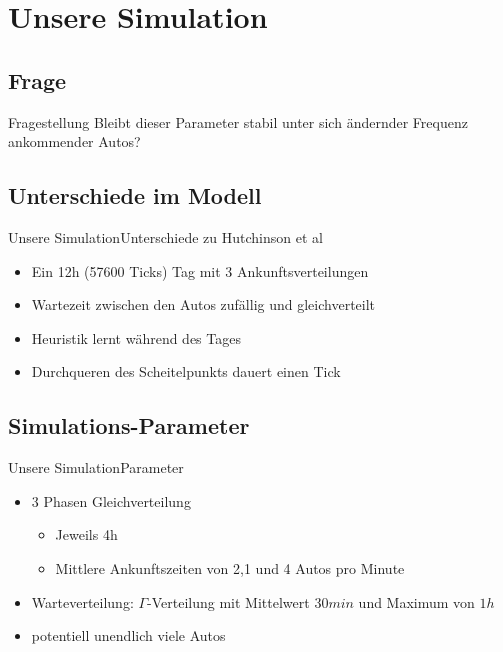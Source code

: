 \documentclass[11pt]{beamer}
\begin{document}
\section{Unsere Simulation}

\subsection{Frage}

\begin{frame}{Fragestellung}
Bleibt dieser Parameter stabil unter sich ändernder Frequenz ankommender Autos?
\end{frame}

\subsection{Unterschiede im Modell}

\begin{frame}{Unsere Simulation}{Unterschiede zu Hutchinson et al}
\begin{itemize}
	\item Ein 12h (57600 Ticks) Tag mit 3 Ankunftsverteilungen 
	\item Wartezeit zwischen den Autos zufällig und gleichverteilt
	\item Heuristik lernt während des Tages
	\item Durchqueren des Scheitelpunkts dauert einen Tick
\end{itemize}
\end{frame}



\subsection{Simulations-Parameter}

\begin{frame}{Unsere Simulation}{Parameter}
\begin{itemize}
	\item 3 Phasen Gleichverteilung
	\begin{itemize}
		\item Jeweils 4h
		\item Mittlere Ankunftszeiten von 2,1 und 4 Autos pro Minute
	\end{itemize}
	\item Warteverteilung:  $\Gamma$-Verteilung mit Mittelwert $30min$ und Maximum von $1h$
	\item potentiell unendlich viele Autos
\end{itemize}
\end{frame}
\end{document}
